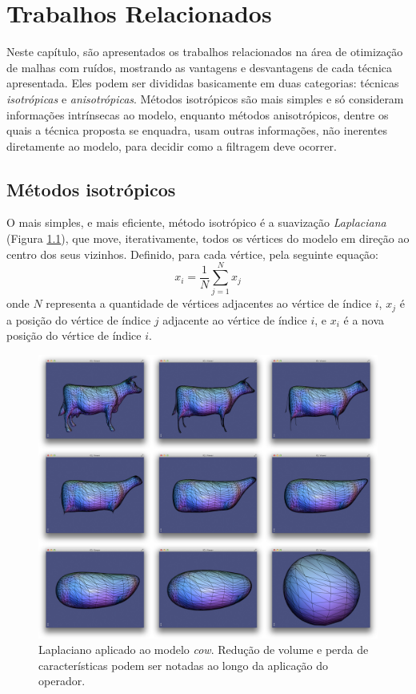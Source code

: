 \chapter{Trabalhos Relacionados}
\label{cap:trabalhos-relacionados}

Neste capítulo, são apresentados os trabalhos relacionados na área de otimização de malhas com ruídos, mostrando as vantagens e desvantagens de cada técnica apresentada. Eles podem ser divididas basicamente em duas categorias: técnicas \textit{isotrópicas} e \textit{anisotrópicas}. Métodos isotrópicos são mais simples e só consideram informações intrínsecas ao modelo, enquanto métodos anisotrópicos, dentre os quais a técnica proposta se enquadra, usam outras informações, não inerentes diretamente ao modelo, para decidir como a filtragem deve ocorrer.

\section{Métodos isotrópicos}
O mais simples, e mais eficiente, método isotrópico é a suavização \textit{Laplaciana} (Figura \ref{fig:laplacian}), que move, iterativamente, todos os vértices do modelo em direção ao centro dos seus vizinhos. Definido, para cada vértice, pela seguinte equação:
\begin{equation} \label{eq:laplacian}
    x_i = \frac{1}{N} \sum^{N}_{j=1} x_j
\end{equation}
onde $N$ representa a quantidade de vértices adjacentes ao vértice de índice $i$, $x_j$ é a posição do vértice de índice $j$ adjacente ao vértice de índice $i$, e $x_i$ é a nova posição do vértice de índice $i$.

\begin{figure}[!h]
\captionsetup{width=\linewidth}
\centering
\includegraphics[scale=0.12]{figuras/laplacian.jpg}
\caption{Laplaciano aplicado ao modelo \textit{cow}. Redução de volume e perda de características podem ser notadas ao longo da aplicação do operador.}
\label{fig:laplacian}
\end{figure}

